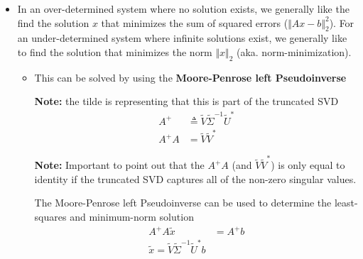 \documentclass[11.5pt,a4paper]{article}
\begin{document}
\begin{itemize}
\begin{itemize}
        \item \textbf{Summary:} if $b \in col(A)$ and $dim(ker(A)) \neq 0$ then there is an infinite number of solutions, $x$. If $b \notin col(A)$ then there are no solutions. 
        
        Essentially, the $dim(ker(A))$ is $n - rank(A)$ where $n$ is the number of columns in $A$. If $dim(ker(A)) > 0$ then the number of variables is greater than constraints. If $dim(ker(A)) = 0$ then number of variables is equal to the number of constraints. 

        \item The fundamental subspaces follow the following equations (where $A$ is $\mathbb{R}^{m\times n}$):
        \begin{align*}
            col(A) \oplus ker(A^*) = \mathbb{R}^n \\
            col(A^*) \oplus ker(A) = \mathbb{R}^n
        \end{align*}
    \end{itemize}
    \item In an over-determined system where no solution exists, we generally like the find the solution $x$ that minimizes the sum of squared errors ($\Vert Ax - b \Vert_2^2 $). For an under-determined system where infinite solutions exist, we generally like to find the solution that minimizes the norm $\Vert x \Vert_2$ (aka. norm-minimization).
    \begin{itemize}
        \item This can be solved by using the \textbf{Moore-Penrose left Pseudoinverse}
        
        \textbf{Note:} the tilde is representing that this is part of the truncated SVD
        \begin{align*}
            A^{+} &\triangleq \tilde{V}\tilde{\Sigma}^{-1}\tilde{U}^*\\
            A^{+}A &= \tilde{V}\tilde{V}^*
        \end{align*}

        \textbf{Note:} Important to point out that the $A^{+}A$ (and $\tilde{V}\tilde{V}^*$) is only equal to identity if the truncated SVD captures all of the non-zero singular values. 
        
        The Moore-Penrose left Pseudoinverse can be used to determine the least-squares and minimum-norm solution
        \begin{align*}
            A^{+}A\tilde{x} &= A^{+}b \\
            \tilde{x} = \tilde{V}\tilde{\Sigma}^{-1}\tilde{U}^*b
        \end{align*}


\end{itemize}
\end{itemize}
\end{document}
